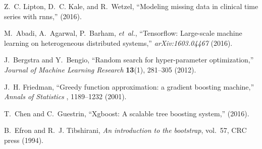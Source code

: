 \documentclass[12pt]{spieman}  %
\begin{document}
\begin{thebibliography}{10}
Z.~C. Lipton, D.~C. Kale, and R.~Wetzel, ``Modeling missing data in clinical
  time series with rnns,''  (2016).

M.~Abadi, A.~Agarwal, P.~Barham, {\em et~al.}, ``Tensorflow: Large-scale
  machine learning on heterogeneous distributed systems,'' {\em
  arXiv:1603.04467}   (2016).

J.~Bergstra and Y.~Bengio, ``Random search for hyper-parameter optimization,''
  {\em Journal of Machine Learning Research} {\bf 13}(1), 281--305  (2012).

J.~H. Friedman, ``Greedy function approximation: a gradient boosting machine,''
  {\em Annals of Statistics} , 1189--1232  (2001).

T.~Chen and C.~Guestrin, ``Xgboost: A scalable tree boosting system,''  (2016).

B.~Efron and R.~J. Tibshirani, {\em An introduction to the bootstrap}, vol.~57,
  CRC press  (1994).

\end{thebibliography}
\end{document}
